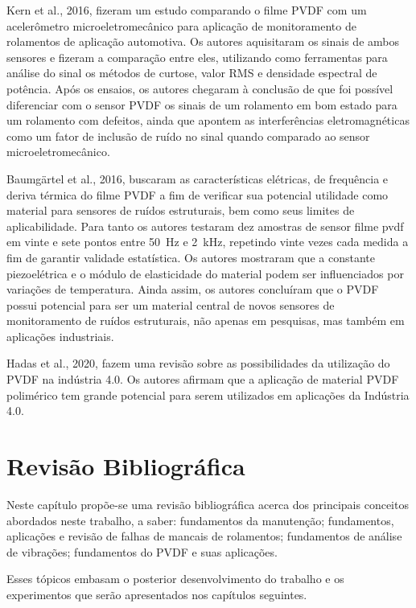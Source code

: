 \documentclass[
	12pt,				
	oneside,			
	a4paper,			
	english,			
	brazil,	
	sumario=abnt-6027-2012		
	]{abntex2ppgsi}
\begin{document}
Kern et al., 2016, fizeram um estudo comparando o filme PVDF com um acelerômetro microeletromecânico para aplicação de monitoramento de rolamentos de aplicação automotiva. Os autores aquisitaram os sinais de ambos sensores e fizeram a comparação entre eles, utilizando como ferramentas para análise do sinal os métodos de curtose, valor RMS e densidade espectral de potência. Após os ensaios, os autores chegaram à conclusão de que foi possível diferenciar com o sensor PVDF os sinais de um rolamento em bom estado para um rolamento com defeitos, ainda que apontem as interferências eletromagnéticas como um fator de inclusão de ruído no sinal quando comparado ao sensor microeletromecânico.

Baumgärtel et al., 2016, buscaram as características elétricas, de frequência e deriva térmica do filme PVDF a fim de verificar sua potencial utilidade como material para sensores de ruídos estruturais, bem como seus limites de aplicabilidade. Para tanto os autores testaram dez amostras de sensor filme pvdf em vinte e sete pontos entre \SI{50}{\hertz} e \SI{2}{\kilo\hertz}, repetindo vinte vezes cada medida a fim de garantir validade estatística. Os autores mostraram que a constante piezoelétrica e o módulo de elasticidade do material podem ser influenciados por variações de temperatura. Ainda assim, os autores concluíram que o PVDF possui potencial para ser um material central de novos sensores de monitoramento de ruídos estruturais, não apenas em pesquisas, mas também em aplicações industriais.

Hadas et al., 2020, fazem uma revisão sobre as possibilidades da utilização do PVDF na indústria 4.0. Os autores afirmam que a aplicação de material PVDF polimérico tem grande potencial para serem utilizados em aplicações da Indústria 4.0. 


\chapter{Revisão Bibliográfica}

Neste capítulo propõe-se uma revisão bibliográfica acerca dos principais conceitos abordados neste trabalho, a saber: fundamentos da manutenção; fundamentos, aplicações e revisão de falhas de mancais de rolamentos; fundamentos de análise de vibrações; fundamentos do PVDF e suas aplicações. 

Esses tópicos embasam o posterior desenvolvimento do trabalho e os experimentos que serão apresentados nos capítulos seguintes.
\end{document}
